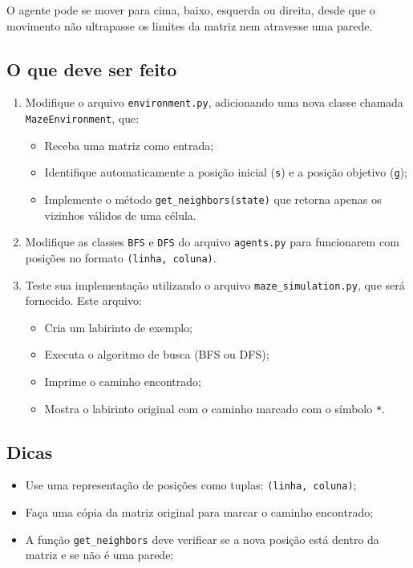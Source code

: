 \documentclass{article}
\begin{document}
O agente pode se mover para cima, baixo, esquerda ou direita, desde que o movimento não ultrapasse os limites da matriz nem atravesse uma parede.

\subsection*{O que deve ser feito}

\begin{enumerate}
    \item Modifique o arquivo \texttt{environment.py}, adicionando uma nova classe chamada \texttt{MazeEnvironment}, que:
    \begin{itemize}
        \item Receba uma matriz como entrada;
        \item Identifique automaticamente a posição inicial (\texttt{s}) e a posição objetivo (\texttt{g});
        \item Implemente o método \texttt{get\_neighbors(state)} que retorna apenas os vizinhos válidos de uma célula.
    \end{itemize}

    \item Modifique as classes \texttt{BFS} e \texttt{DFS} do arquivo \texttt{agents.py} para funcionarem com posições no formato \texttt{(linha, coluna)}.

    \item Teste sua implementação utilizando o arquivo \texttt{maze\_simulation.py}, que será fornecido. Este arquivo:
    \begin{itemize}
        \item Cria um labirinto de exemplo;
        \item Executa o algoritmo de busca (BFS ou DFS);
        \item Imprime o caminho encontrado;
        \item Mostra o labirinto original com o caminho marcado com o símbolo \texttt{*}.
    \end{itemize}
\end{enumerate}

\subsection*{Dicas}

\begin{itemize}
    \item Use uma representação de posições como tuplas: \texttt{(linha, coluna)};
    \item Faça uma cópia da matriz original para marcar o caminho encontrado;
    \item A função \texttt{get\_neighbors} deve verificar se a nova posição está dentro da matriz e se não é uma parede;
\end{itemize}
\end{document}
